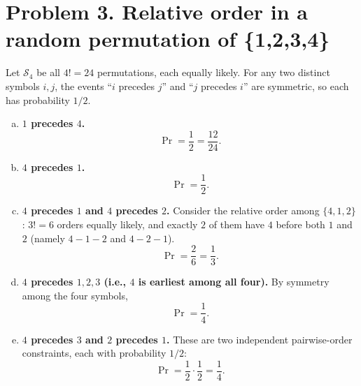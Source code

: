 
\section*{Problem 3. Relative order in a random permutation of \{1,2,3,4\}}

Let $\mathcal{S}_4$ be all $4!=24$ permutations, each equally likely.  
For any two distinct symbols $i,j$, the events “$i$ precedes $j$” and “$j$ precedes $i$” are symmetric, so each has probability $1/2$.

\begin{enumerate}[(a)]
\item \textbf{$1$ precedes $4$.}
\[
\Pr=\frac{1}{2}=\frac{12}{24}.
\]

\item \textbf{$4$ precedes $1$.}
\[
\Pr=\frac{1}{2}.
\]

\item \textbf{$4$ precedes $1$ and $4$ precedes $2$.}
Consider the relative order among $\{4,1,2\}$: $3!=6$ orders equally likely, and exactly $2$ of them have $4$ before both $1$ and $2$ (namely $4\!-\!1\!-\!2$ and $4\!-\!2\!-\!1$).
\[
\Pr=\frac{2}{6}=\frac{1}{3}.
\]

\item \textbf{$4$ precedes $1,2,3$ (i.e., $4$ is earliest among all four).}
By symmetry among the four symbols,
\[
\Pr=\frac{1}{4}.
\]

\item \textbf{$4$ precedes $3$ and $2$ precedes $1$.}
These are two independent pairwise-order constraints, each with probability $1/2$:
\[
\Pr=\frac{1}{2}\cdot\frac{1}{2}=\frac{1}{4}.
\]
\end{enumerate}
